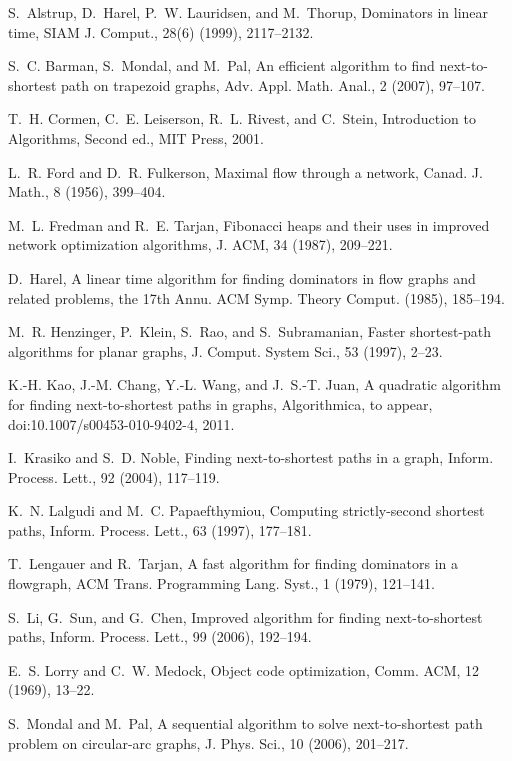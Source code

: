 \documentclass[review]{elsarticle}
\begin{document}
\begin{thebibliography}{99}

 S.~Alstrup, D.~Harel, P.~W. Lauridsen, and M.~Thorup, Dominators in linear time, SIAM J. Comput., 28(6) (1999), 2117--2132.

 S.~C. Barman, S.~Mondal, and M.~Pal, An efficient algorithm to find next-to-shortest path on trapezoid
graphs, Adv. Appl. Math. Anal., 2 (2007), 97--107.

T.~H. Cormen, C.~E. Leiserson, R.~L. Rivest, and C.~Stein,
Introduction to Algorithms, Second ed., MIT Press, 2001.

 L.~R. Ford and D.~R. Fulkerson, Maximal flow through a network, Canad. J. Math., 8 (1956), 399--404.

M.~L. Fredman and R.~E. Tarjan, Fibonacci heaps and their
uses in improved network optimization algorithms, J. ACM, 34
(1987), 209--221.

D.~Harel, A linear time algorithm for finding dominators
in flow graphs and related problems, the 17th Annu. ACM Symp.
Theory Comput. (1985), 185--194.

M.~R. Henzinger, P.~Klein, S.~Rao, and S.~Subramanian, 
Faster shortest-path algorithms for planar graphs, J. Comput.
System Sci., 53 (1997), 2--23.

K.-H. Kao, J.-M. Chang, Y.-L. Wang, and J.~S.-T. Juan, A
quadratic algorithm for finding next-to-shortest paths in graphs,
Algorithmica, to appear, doi:10.1007/s00453-010-9402-4, 2011.

 I.~Krasiko and S.~D. Noble, Finding next-to-shortest paths in a graph, Inform. Process. Lett., 92 (2004), 117--119.

 K.~N. Lalgudi and M.~C. Papaefthymiou, Computing strictly-second shortest paths, Inform. Process. Lett., 63 (1997), 177--181.

T.~Lengauer and R.~Tarjan, A fast algorithm for finding
dominators in a flowgraph, ACM Trans. Programming Lang. Syst., 1
(1979), 121--141.

 S.~Li, G.~Sun, and G.~Chen, Improved algorithm for finding next-to-shortest paths, Inform. Process. Lett., 99 (2006), 192--194.

 E.~S. Lorry and C.~W. Medock, Object code optimization, Comm. ACM, 12 (1969), 13--22.

 S.~Mondal and M.~Pal, A sequential algorithm to solve next-to-shortest path problem on circular-arc graphs, J. Phys. Sci., 10 (2006), 201--217.


\end{thebibliography}
\end{document}
